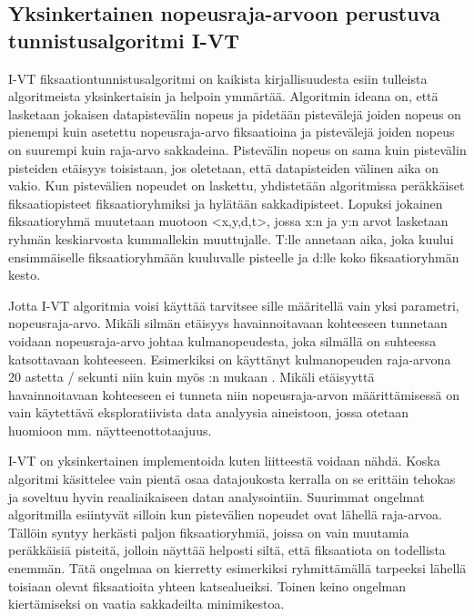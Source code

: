 \subsection{Yksinkertainen nopeusraja-arvoon perustuva tunnistusalgoritmi I-VT}
I-VT fiksaationtunnistusalgoritmi on kaikista kirjallisuudesta esiin tulleista algoritmeista yksinkertaisin ja helpoin ymmärtää. Algoritmin ideana on, että lasketaan jokaisen datapistevälin nopeus ja pidetään pistevälejä joiden nopeus on pienempi kuin asetettu nopeusraja-arvo fiksaatioina ja pistevälejä joiden nopeus on suurempi kuin raja-arvo sakkadeina. Pistevälin nopeus on sama kuin pistevälin pisteiden etäisyys toisistaan, jos oletetaan, että datapisteiden välinen aika on vakio. Kun pistevälien nopeudet on laskettu, yhdistetään algoritmissa peräkkäiset fiksaatiopisteet fiksaatioryhmiksi ja hylätään sakkadipisteet. Lopuksi jokainen fiksaatioryhmä muutetaan muotoon <x,y,d,t>, jossa x:n ja y:n arvot lasketaan ryhmän keskiarvosta kummallekin muuttujalle. T:lle annetaan aika, joka kuului ensimmäiselle fiksaatioryhmään kuuluvalle pisteelle ja d:lle koko fiksaatioryhmän kesto. \citep[s. 73]{salvucci2000}

 Jotta I-VT algoritmia voisi käyttää tarvitsee sille määritellä vain yksi parametri, nopeusraja-arvo. Mikäli silmän etäisyys havainnoitavaan kohteeseen tunnetaan voidaan nopeusraja-arvo johtaa kulmanopeudesta, joka silmällä on suhteessa katsottavaan kohteeseen. Esimerkiksi \citet[s. 1099]{itti2005} on käyttänyt kulmanopeuden raja-arvona 20 astetta / sekunti niin kuin myös \citet[s. 73]{salvucci2000}:n mukaan \citep[s. 103-111]{megaw1984}.
Mikäli etäisyyttä havainnoitavaan kohteeseen ei tunneta niin nopeusraja-arvon määrittämisessä on vain käytettävä eksploratiivista data analyysia aineistoon, jossa otetaan huomioon mm. näytteenottotaajuus.

I-VT on yksinkertainen implementoida kuten liitteestä \emph{}  voidaan nähdä. Koska algoritmi käsittelee vain pientä osaa datajoukosta kerralla on se erittäin tehokas ja soveltuu hyvin reaaliaikaiseen datan analysointiin. \citep[s. 76]{salvucci2000} Suurimmat ongelmat algoritmilla esiintyvät silloin kun pistevälien nopeudet ovat lähellä raja-arvoa. Tällöin syntyy herkästi paljon fiksaatioryhmiä, joissa on vain muutamia peräkkäisiä pisteitä, jolloin näyttää helposti siltä, että fiksaatiota on todellista enemmän. Tätä ongelmaa on kierretty esimerkiksi ryhmittämällä tarpeeksi lähellä toisiaan olevat fiksaatioita yhteen katsealueiksi. \citep[s. 329]{just1980} Toinen keino ongelman kiertämiseksi on vaatia sakkadeilta minimikestoa. \citep[s. 103-111]{megaw1984}

